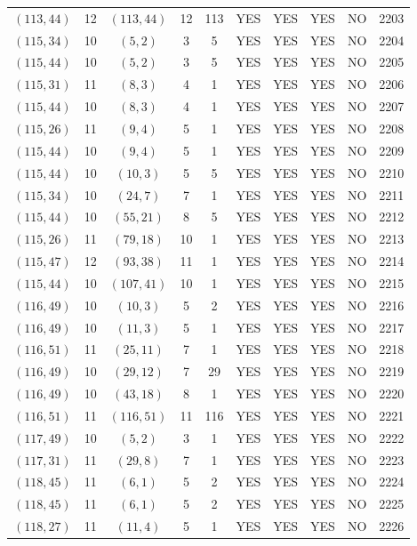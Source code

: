 \begin{longtable}{|c|c|c|c|c|c|c|c|c|c|}
$(113, 44)$ & 12 & $(113, 44)$ & 12 & 113 & YES & YES & YES & NO & 2203\\
$(115, 34)$ & 10 & $(5, 2)$ & 3 & 5 & YES & YES & YES & NO & 2204\\
$(115, 44)$ & 10 & $(5, 2)$ & 3 & 5 & YES & YES & YES & NO & 2205\\
$(115, 31)$ & 11 & $(8, 3)$ & 4 & 1 & YES & YES & YES & NO & 2206\\
$(115, 44)$ & 10 & $(8, 3)$ & 4 & 1 & YES & YES & YES & NO & 2207\\
$(115, 26)$ & 11 & $(9, 4)$ & 5 & 1 & YES & YES & YES & NO & 2208\\
$(115, 44)$ & 10 & $(9, 4)$ & 5 & 1 & YES & YES & YES & NO & 2209\\
$(115, 44)$ & 10 & $(10, 3)$ & 5 & 5 & YES & YES & YES & NO & 2210\\
$(115, 34)$ & 10 & $(24, 7)$ & 7 & 1 & YES & YES & YES & NO & 2211\\
$(115, 44)$ & 10 & $(55, 21)$ & 8 & 5 & YES & YES & YES & NO & 2212\\
$(115, 26)$ & 11 & $(79, 18)$ & 10 & 1 & YES & YES & YES & NO & 2213\\
$(115, 47)$ & 12 & $(93, 38)$ & 11 & 1 & YES & YES & YES & NO & 2214\\
$(115, 44)$ & 10 & $(107, 41)$ & 10 & 1 & YES & YES & YES & NO & 2215\\
$(116, 49)$ & 10 & $(10, 3)$ & 5 & 2 & YES & YES & YES & NO & 2216\\
$(116, 49)$ & 10 & $(11, 3)$ & 5 & 1 & YES & YES & YES & NO & 2217\\
$(116, 51)$ & 11 & $(25, 11)$ & 7 & 1 & YES & YES & YES & NO & 2218\\
$(116, 49)$ & 10 & $(29, 12)$ & 7 & 29 & YES & YES & YES & NO & 2219\\
$(116, 49)$ & 10 & $(43, 18)$ & 8 & 1 & YES & YES & YES & NO & 2220\\
$(116, 51)$ & 11 & $(116, 51)$ & 11 & 116 & YES & YES & YES & NO & 2221\\
$(117, 49)$ & 10 & $(5, 2)$ & 3 & 1 & YES & YES & YES & NO & 2222\\
$(117, 31)$ & 11 & $(29, 8)$ & 7 & 1 & YES & YES & YES & NO & 2223\\
$(118, 45)$ & 11 & $(6, 1)$ & 5 & 2 & YES & YES & YES & NO & 2224\\
$(118, 45)$ & 11 & $(6, 1)$ & 5 & 2 & YES & YES & YES & NO & 2225\\
$(118, 27)$ & 11 & $(11, 4)$ & 5 & 1 & YES & YES & YES & NO & 2226\\

\end{longtable}
